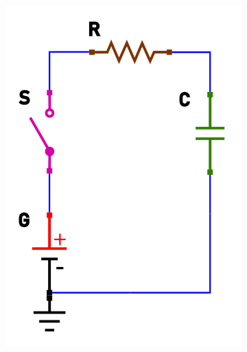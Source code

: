 \documentclass[12pt]{article}
\begin{document}
\begin{figure}[h!]
  \centering
  \begin{subfigure}[b]{0.3\linewidth}
    \includegraphics[width=\linewidth]{data/carica-open.png}
  \end{subfigure}
  \begin{subfigure}[b]{0.3\linewidth}

\end{subfigure}
\end{figure}
\end{document}

